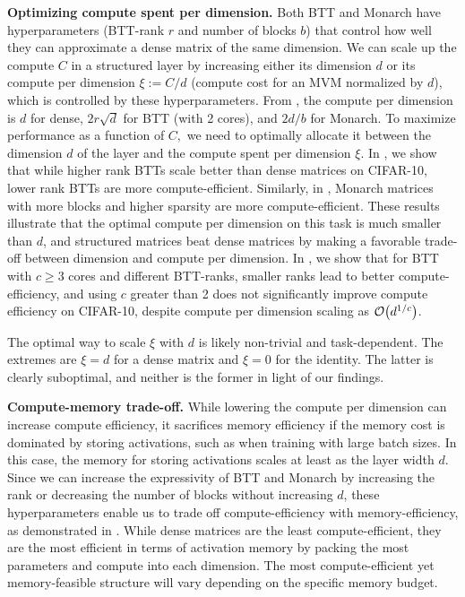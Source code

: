 \documentclass{article}
\theoremstyle{plain}
\theoremstyle{definition}
\theoremstyle{remark}
\begin{document}
\noindent \textbf{Optimizing compute spent per dimension.} \quad Both BTT and Monarch have hyperparameters (BTT-rank $r$ and number of blocks $b$) that control how well they can approximate a dense matrix of the same dimension. We can scale up the compute $C$ in a structured layer by increasing either its dimension $d$ or its compute per dimension $\xi:=C/d$ (compute cost for an MVM normalized by $d$), which is controlled by these hyperparameters. From , the compute per dimension is $d$ for dense, $2r\sqrt{d}$ for BTT (with 2 cores), and $2d/b$ for Monarch. To maximize performance as a function of $C,$ we need to optimally allocate it between the dimension $d$ of the layer and the compute spent per dimension $\xi$. In , we show that while higher rank BTTs scale better than dense matrices on CIFAR-10, lower rank BTTs are more compute-efficient. Similarly, in , Monarch matrices with more blocks and higher sparsity are more compute-efficient. These results illustrate that the optimal compute per dimension on this task is much smaller than $d$, and structured matrices beat dense matrices by making a favorable trade-off between dimension and compute per dimension.
In , we show that for BTT with $c \geq 3$ cores and different BTT-ranks, smaller ranks lead to better compute-efficiency, and using $c$ greater than 2 does not significantly improve compute efficiency on CIFAR-10, despite compute per dimension scaling as $\order{d^{1/c}}$.

The optimal way to scale $\xi$ with $d$ is likely non-trivial and task-dependent. The extremes are $\xi = d$ for a dense matrix and $\xi=0$ for the identity. The latter is clearly suboptimal, and neither is the former in light of our findings.

\noindent \textbf{Compute-memory trade-off.} \quad While lowering the compute per dimension can increase compute efficiency, it sacrifices memory efficiency if the memory cost is dominated by storing activations, such as when training with large batch sizes. In this case, the memory for storing activations scales at least as the layer width $d$. Since we can increase the expressivity of BTT and Monarch by increasing the rank or decreasing the number of blocks without increasing $d$, these hyperparameters enable us to trade off compute-efficiency with memory-efficiency, as demonstrated in . While dense matrices are the least compute-efficient, they are the most efficient in terms of activation memory by packing the most parameters and compute into each dimension. The most compute-efficient yet memory-feasible structure will vary depending on the specific memory budget.
\end{document}
